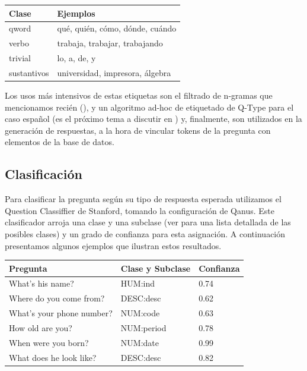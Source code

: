 \begin{center}
\begin{tabular}{| l | l |}
\hline
Clase & Ejemplos\\ \hline
qword  & qué, quién, cómo, dónde, cuándo\\ \hline
verbo & trabaja, trabajar, trabajando \\ \hline
trivial  & lo, a, de, y \\ \hline
sustantivos  & universidad, impresora, álgebra \\ \hline
\end{tabular}
\end{center}

Los usos más intensivos de estas etiquetas son el filtrado de n-gramas que mencionamos recién (), y un algoritmo ad-hoc de etiquetado de Q-Type para el caso español (es el próximo tema a discutir en ) y, finalmente, son utilizados en la generación de respuestas, a la hora de vincular tokens de la pregunta con elementos de la base de datos.

\subsection{Clasificación}
\label{subsec:qtype}
Para clasificar la pregunta según su tipo de respuesta esperada utilizamos el Question Classiffier de Stanford, tomando la configuración de Qanus. Este clasificador arroja una clase y una subclase (ver  para una lista detallada de las posibles clases) y un grado de confianza para esta asignación. A continuación presentamos algunos ejemplos que ilustran estos resultados.

\begin{center}
\begin{tabular}{| l | l | l |}
\hline
Pregunta & Clase y Subclase & Confianza\\ \hline 
What's his name? & HUM:ind & 0.74 \\ \hline 
Where do you come from? & DESC:desc & 0.62 \\ \hline 
What's your phone number? & NUM:code & 0.63 \\ \hline 
How old are you? & NUM:period & 0.78 \\ \hline 
When were you born? & NUM:date & 0.99 \\ \hline 
What does he look like? & DESC:desc & 0.82 \\ \hline 
\end{tabular}
\end{center}


